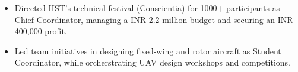 
\begin{cvparagraph}
 \begin{itemize} %
      \item {Directed IIST's technical festival (Conscientia) for 1000+ participants as Chief Coordinator, managing a INR 2.2 million budget and securing an INR 400,000 profit.}
      \item{Led team initiatives in designing fixed-wing and rotor aircraft as Student Coordinator, while orcherstrating UAV design workshops and competitions.} 
\end{itemize}
\end{cvparagraph}